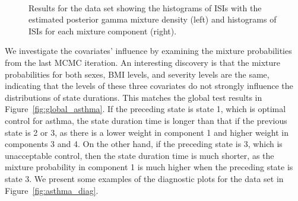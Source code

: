\begin{figure}[!ht]
\centering
{}
\qquad
{}\\
\caption{Results for the  data set showing the histograms of ISIs with the estimated posterior gamma mixture density (left) and histograms of ISIs for each mixture component (right). 
 }
\label{fig:hist_asthma}
\end{figure}



{We investigate the covariates' influence by examining the mixture probabilities from the last MCMC iteration. %
An interesting discovery is that the mixture probabilities for both sexes, BMI levels, and severity levels are the same, indicating that the levels of these three covariates do not strongly influence the distributions of state durations.  
This matches the global test results in Figure~\ref{fig:global_asthma}.  
If the preceding state is state 1, which is optimal control for asthma, the state duration time is longer than that if the previous state is 2 or 3, as there is a lower weight in component 1 and higher weight in components 3 and 4. 
On the other hand,  if the preceding state is 3, which is unacceptable control, then the state duration time is much shorter, as the mixture probability in component 1 is much higher when the preceding state is state 3. 
We present some examples of the diagnostic plots for the  data set in Figure~\ref{fig:asthma_diag}.
}



